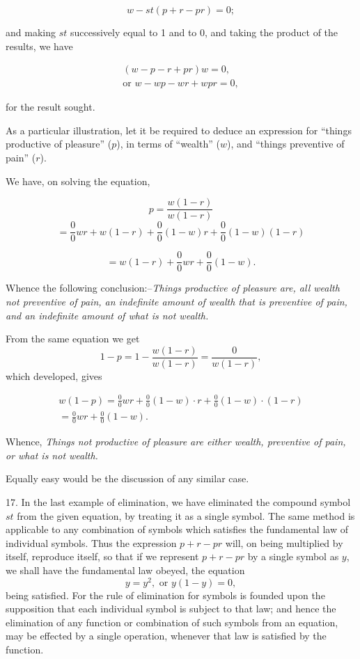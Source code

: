 \documentclass[oneside]{book}
\begin{document}
\[
w - st (p + r - pr) = 0;
\]

and making $st$ successively equal to 1 and to 0, and taking the
product of the results, we have

\begin{eqnarray*}
(w - p - r + pr) w = 0,\\
\textrm{or }  w - wp - wr + wpr = 0,
\end{eqnarray*}

for the result sought.

As a particular illustration, let it be required to deduce an
expression for ``things productive of pleasure'' ($p$), in terms of
``wealth'' ($w$), and ``things preventive of pain'' ($r$).

We have, on solving the equation,

\[
p = \frac{w(1-r)}{w(1-r)}
\]
\[
= \frac{0}{0}wr + w(1 - r) + \frac{0}{0}(1 - w)r + \frac{0}{0} (1 - w) (1 - r)
\]

\[
= w(1 - r) + \frac{0}{0}wr + \frac{0}{0}(1 - w).
\]

Whence the following conclusion:--\textit{Things productive of pleasure
are, all wealth not preventive of pain, an indefinite amount
of wealth that is preventive of pain, and an indefinite amount of
what is not wealth.}

From the same equation we get
\[
1-p = 1-\frac{w(1-r)}{w(1-r)} = \frac{0}{w(1-r)},
\]
which developed, gives

\begin{eqnarray*}
w(1-p)
= \frac{0}{0}wr+\frac{0}{0}(1-w){\cdot}r+\frac{0}{0}(1-w)\cdot(1-r)\\
= \frac{0}{0}wr+\frac{0}{0}(1-w).
\end{eqnarray*}

Whence, \textit {Things not productive of pleasure are either wealth, preventive
of pain, or what is not wealth.}

Equally easy would be the discussion of any similar case.

17. In the last example of elimination, we have eliminated
the compound symbol $st$ from the given equation, by treating it
as a single symbol. The same method is applicable to any combination
of symbols which satisfies the fundamental law of individual
symbols. Thus the expression $p+r-pr$ will, on being
multiplied by itself, reproduce itself, so that if we represent
$p+r-pr$ by a single symbol as $y$, we shall have the fundamental
law obeyed, the equation
\[
y = y^2,\textrm{ or } y(1-y) = 0,
\]
being satisfied. For the rule of elimination for symbols is founded
upon the supposition that each individual symbol is subject to
that law; and hence the elimination of any function or combination
of such symbols from an equation, may be effected by a single
operation, whenever that law is satisfied by the function.
\end{document}
